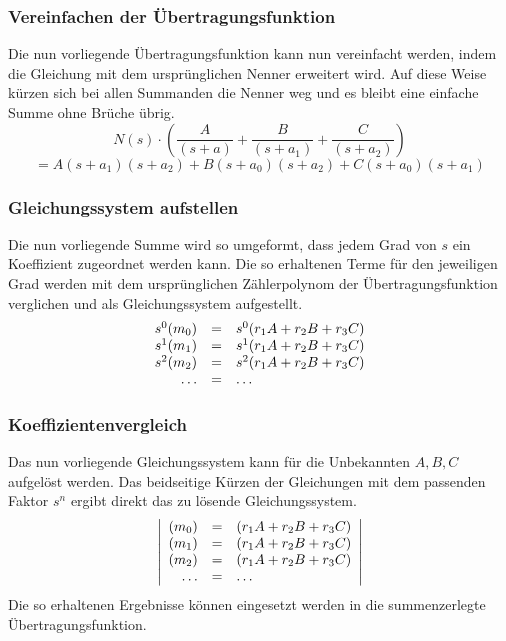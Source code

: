 \subsubsection{Vereinfachen der Übertragungsfunktion}
Die nun vorliegende Übertragungsfunktion kann nun vereinfacht werden, indem
die Gleichung mit dem ursprünglichen Nenner erweitert wird. Auf diese
Weise kürzen sich bei allen Summanden die Nenner weg und es bleibt eine
einfache Summe ohne Brüche übrig.
\[  
    N(s) \cdot \left( 
        \frac{A}{(s+a)} 
        + \frac{B}{(s+a_1)} 
        + \frac{C}{(s+a_2)} 
    \right) 
\]
%
\[
    = A(s+a_1)(s+a_2) + B(s+a_0)(s+a_2) + C(s+a_0)(s+a_1)
\]

\subsubsection{Gleichungssystem aufstellen}
Die nun vorliegende Summe wird so umgeformt, dass jedem Grad von $s$ ein
Koeffizient zugeordnet werden kann. Die so erhaltenen Terme für den
jeweiligen Grad werden mit dem ursprünglichen Zählerpolynom der 
Übertragungsfunktion verglichen und als Gleichungssystem aufgestellt.
\[ 
    \begin{array}{r c l}  
        s^0(m_0) & = & s^0(r_1 A + r_2 B + r_3 C) \\
        s^1(m_1) & = & s^1(r_1 A + r_2 B + r_3 C) \\
        s^2(m_2) & = & s^2(r_1 A + r_2 B + r_3 C) \\
        \dots   & = & \dots
    \end{array}
\]


\subsubsection{Koeffizientenvergleich}
Das nun vorliegende Gleichungssystem kann für die Unbekannten $A,B,C$ 
aufgelöst werden. Das beidseitige Kürzen der Gleichungen mit dem 
passenden Faktor $s^n$ ergibt direkt das zu lösende Gleichungssystem. 
\[  
    \left\lvert \begin{array}{r c l}
        (m_0) & = & (r_1 A + r_2 B + r_3 C) \\
        (m_1) & = & (r_1 A + r_2 B + r_3 C) \\
        (m_2) & = & (r_1 A + r_2 B + r_3 C) \\
        \dots   & = & \dots 
    \end{array} \right\rvert
\]
Die so erhaltenen Ergebnisse können eingesetzt werden in die 
summenzerlegte Übertragungsfunktion.
